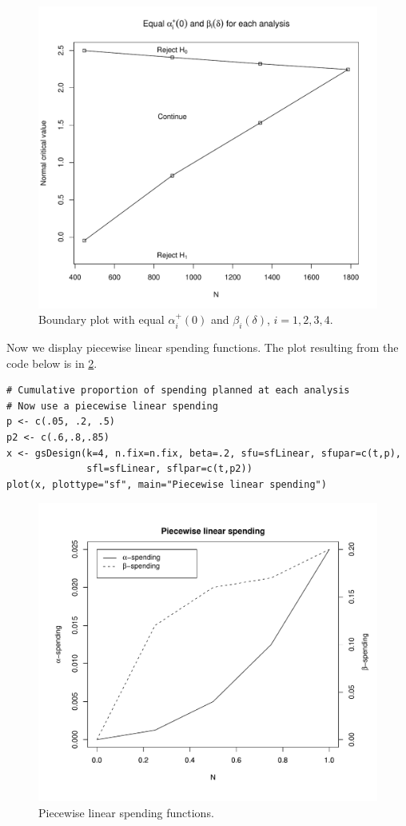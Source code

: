 \begin{figure}
\begin{center}
\includegraphics[width=.6\textwidth]{figs/boundplot2.pdf}
\end{center}
\caption{Boundary plot with equal $\alpha_i^+(0)$ and $\beta_i(\delta)$, $i=1, 2,3,4$.\label{fig:sfPoints}}
\end{figure}

Now we display piecewise linear spending functions. The plot resulting from the code below is in \ref{fig:sfLinear}.
\begin{verbatim}
# Cumulative proportion of spending planned at each analysis
# Now use a piecewise linear spending
p <- c(.05, .2, .5)
p2 <- c(.6,.8,.85)
x <- gsDesign(k=4, n.fix=n.fix, beta=.2, sfu=sfLinear, sfupar=c(t,p),
              sfl=sfLinear, sflpar=c(t,p2))
plot(x, plottype="sf", main="Piecewise linear spending")
\end{verbatim}

\begin{figure}
\begin{center}
\includegraphics[width=.6\textwidth]{figs/sfLinear.pdf}
\end{center}
\caption{Piecewise linear spending functions.\label{fig:sfLinear}}
\end{figure}

